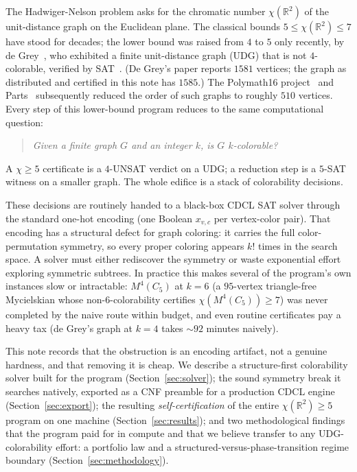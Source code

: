 \documentclass[11pt]{article}
\theoremstyle{definition}
\newcommand{\R}{\mathbb{R}}
\newcommand{\chrom}{\chi}
\begin{document}
The Hadwiger-Nelson problem asks for the chromatic number $\chrom(\R^2)$ of the
unit-distance graph on the Euclidean plane. The classical bounds
$5 \le \chrom(\R^2) \le 7$ have stood for decades; the lower bound was raised from
$4$ to $5$ only recently, by de Grey~\cite{deGrey2018}, who exhibited a finite
unit-distance graph (UDG) that is not $4$-colorable, verified
by SAT~\cite{Heule2018verify}. (De Grey's paper reports $1581$ vertices; the graph
as distributed and certified in this note has $1585$.) The Polymath16
project~\cite{Polymath16} and
Parts~\cite{Parts2020} subsequently reduced the order of such graphs to roughly
$510$ vertices. Every step of this lower-bound program reduces to the same
computational question:
\begin{quote}
\emph{Given a finite graph $G$ and an integer $k$, is $G$ $k$-colorable?}
\end{quote}
A $\chrom \ge 5$ certificate is a $4$-UNSAT verdict on a UDG; a reduction step is a
$5$-SAT witness on a smaller graph. The whole edifice is a stack of colorability
decisions.

These decisions are routinely handed to a black-box CDCL SAT solver through the
standard one-hot encoding (one Boolean $x_{v,c}$ per vertex-color pair). That
encoding has a structural defect for graph coloring: it carries the full
color-permutation symmetry, so every proper coloring appears $k!$ times in the
search space. A solver must either rediscover the symmetry or waste exponential
effort exploring symmetric subtrees. In practice this makes several of the
program's own instances slow or intractable: $M^4(C_5)$ at $k=6$ (a $95$-vertex
triangle-free Mycielskian whose non-$6$-colorability certifies
$\chrom(M^4(C_5)) \ge 7$) was never completed by the naive route within budget,
and even routine certificates pay a heavy tax (de Grey's graph at $k=4$ takes
$\sim\!92$ minutes naively).

This note records that the obstruction is an encoding artifact, not a genuine
hardness, and that removing it is cheap. We describe a structure-first
colorability solver built for the program (Section~\ref{sec:solver}); the
sound symmetry break it searches natively, exported as a CNF preamble for a
production CDCL engine (Section~\ref{sec:export}); the resulting
\emph{self-certification} of the entire $\chrom(\R^2) \ge 5$ program on one machine
(Section~\ref{sec:results}); and two methodological findings that the program
paid for in compute and that we believe transfer to any UDG-colorability effort:
a portfolio law and a structured-versus-phase-transition regime boundary
(Section~\ref{sec:methodology}).
\end{document}
